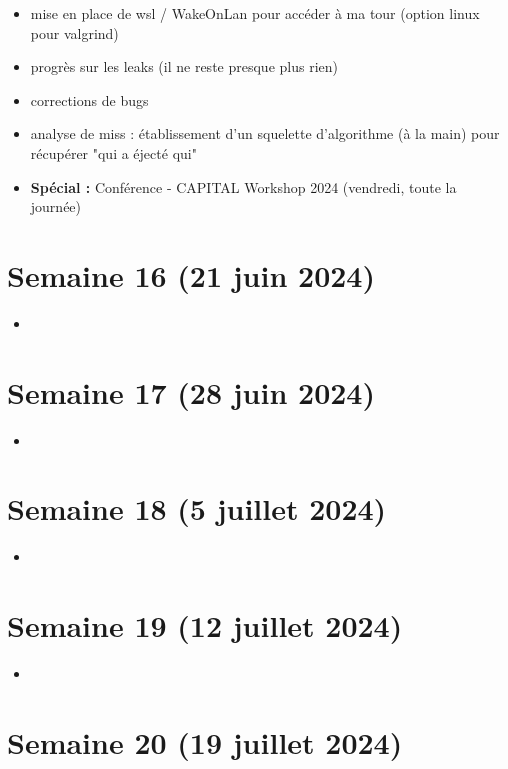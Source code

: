\documentclass[a4paper,12pt]{article}
\begin{document}
\begin{itemize}
  \item mise en place de wsl / WakeOnLan pour accéder à ma tour (option linux pour valgrind)
  \item progrès sur les leaks (il ne reste presque plus rien)
  \item corrections de bugs
  \item analyse de miss : établissement d'un squelette d'algorithme (à la main) pour récupérer "qui a éjecté qui"
  \item \textbf{Spécial :} Conférence - CAPITAL Workshop 2024 (vendredi, toute la journée)
\end{itemize}

\section{Semaine 16 (21 juin 2024)}

\begin{itemize}
  \item ~
\end{itemize}

\section{Semaine 17 (28 juin 2024)}

\begin{itemize}
  \item ~
\end{itemize}

\section{Semaine 18 (5 juillet 2024)}

\begin{itemize}
  \item ~
\end{itemize}

\section{Semaine 19 (12 juillet 2024)}

\begin{itemize}
  \item ~
\end{itemize}

\section{Semaine 20 (19 juillet 2024)}
\end{document}
